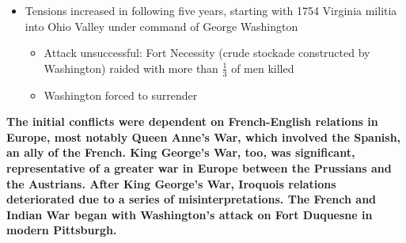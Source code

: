\documentclass[a4paper]{article}
\begin{document}
{\begin{itemize}
\begin{itemize}
            \item Tensions increased in following five years, starting with 1754 Virginia militia into Ohio Valley under command of George Washington
            \begin{itemize}
                \item Attack unsuccessful: Fort Necessity (crude stockade constructed by Washington) raided with more than $\frac{1}{3}$ of men killed 
                \item Washington forced to surrender
            \end{itemize}
        \end{itemize}
    \end{itemize}
    \textbf{The initial conflicts were dependent on French-English relations in Europe, most notably Queen Anne's War, which involved the Spanish, an ally of the French. King George's War, too, was significant, representative of a greater war in Europe between the Prussians and the Austrians. After King George's War, Iroquois relations deteriorated due to a series of misinterpretations. The French and Indian War began with Washington's attack on Fort Duquesne in modern Pittsburgh.}}
\end{document}
